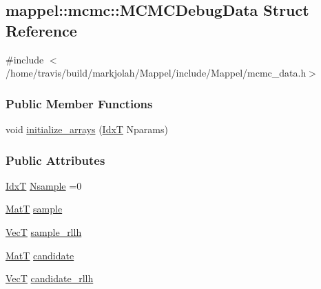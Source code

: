 \hypertarget{structmappel_1_1mcmc_1_1MCMCDebugData}{}\subsection{mappel\+:\+:mcmc\+:\+:M\+C\+M\+C\+Debug\+Data Struct Reference}
\label{structmappel_1_1mcmc_1_1MCMCDebugData}


{\ttfamily \#include $<$/home/travis/build/markjolah/\+Mappel/include/\+Mappel/mcmc\+\_\+data.\+h$>$}

\subsubsection*{Public Member Functions}
\begin{DoxyCompactItemize}
\item 
void \hyperlink{structmappel_1_1mcmc_1_1MCMCDebugData_ac8a3717b4ea2fce71fe79b85ddc657a6}{initialize\+\_\+arrays} (\hyperlink{namespacemappel_ab17ec0f30b61ece292439d7ece81d3a8}{IdxT} Nparams)
\end{DoxyCompactItemize}
\subsubsection*{Public Attributes}
\begin{DoxyCompactItemize}
\item 
\hyperlink{namespacemappel_ab17ec0f30b61ece292439d7ece81d3a8}{IdxT} \hyperlink{structmappel_1_1mcmc_1_1MCMCDebugData_ad001804f5adce124355dbd6ded691d7f}{Nsample} =0
\item 
\hyperlink{namespacemappel_a7091ab87c528041f7e2027195fad8915}{MatT} \hyperlink{structmappel_1_1mcmc_1_1MCMCDebugData_ad6dd0a8a4ee0b8a532e0c041b8cde1d9}{sample}
\item 
\hyperlink{namespacemappel_a2225ad69f358daa3f4f99282a35b9a3a}{VecT} \hyperlink{structmappel_1_1mcmc_1_1MCMCDebugData_a02b5c1388b6fa43c9aee01c63cda8111}{sample\+\_\+rllh}
\item 
\hyperlink{namespacemappel_a7091ab87c528041f7e2027195fad8915}{MatT} \hyperlink{structmappel_1_1mcmc_1_1MCMCDebugData_a62424ee51a10b39b9245945743761c27}{candidate}
\item 
\hyperlink{namespacemappel_a2225ad69f358daa3f4f99282a35b9a3a}{VecT} \hyperlink{structmappel_1_1mcmc_1_1MCMCDebugData_a554ee027879c8bad30bcc637ec88b113}{candidate\+\_\+rllh}
\end{DoxyCompactItemize}


